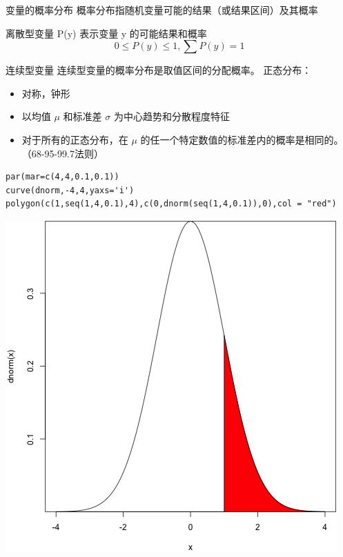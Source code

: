 \documentclass[presentation]{beamer}
\begin{document}
\begin{frame}[fragile,label={sec:orgd478bce}]{变量的概率分布}
 概率分布指随机变量可能的结果（或结果区间）及其概率

\begin{block}{离散型变量}
P(y) 表示变量 y 的可能结果和概率
\[0\leq P(y) \leq 1, \sum P(y)=1\]
\end{block}

\begin{block}{连续型变量}
连续型变量的概率分布是取值区间的分配概率。
正态分布：
\begin{itemize}
\item 对称，钟形
\item 以均值 \(\mu\) 和标准差 \(\sigma\) 为中心趋势和分散程度特征
\item 对于所有的正态分布，在 \(\mu\) 的任一个特定数值的标准差内的概率是相同的。（68-95-99.7法则）
\end{itemize}
\begin{verbatim}
par(mar=c(4,4,0.1,0.1))
curve(dnorm,-4,4,yaxs='i')
polygon(c(1,seq(1,4,0.1),4),c(0,dnorm(seq(1,4,0.1)),0),col = "red")
\end{verbatim}

\begin{center}
\includegraphics[width=.9\linewidth]{1.png}
\end{center}
\end{block}
\end{frame}
\end{document}
